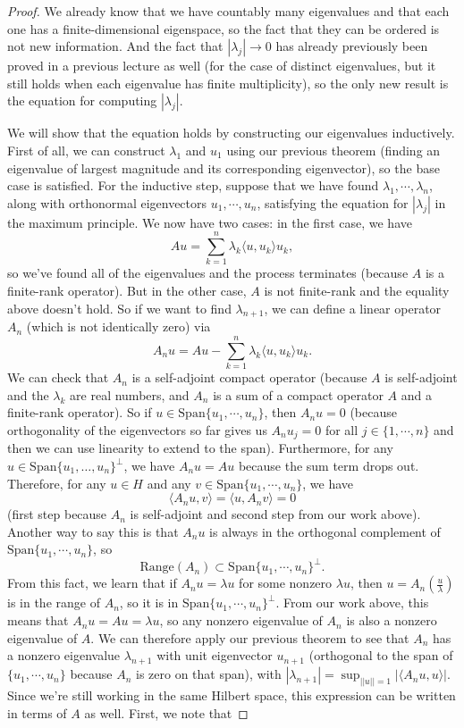 \begin{proof}
We already know that we have countably many eigenvalues and that each one has a finite-dimensional eigenspace, so the fact that they can be ordered is not new information. And the fact that $|\lambda_j| \to 0$ has already previously been proved in a previous lecture as well (for the case of distinct eigenvalues, but it still holds when each eigenvalue has finite multiplicity), so the only new result is the equation for computing $|\lambda_j|$. 

We will show that the equation holds by constructing our eigenvalues inductively. First of all, we can construct $\lambda_1$ and $u_1$ using our previous theorem (finding an eigenvalue of largest magnitude and its corresponding eigenvector), so the base case is satisfied. For the inductive step, suppose that we have found $\lambda_1, \cdots, \lambda_n$, along with orthonormal eigenvectors $u_1, \cdots, u_n$, satisfying the equation for $|\lambda_j|$ in the maximum principle. We now have two cases: in the first case, we have 
\[
    Au = \sum_{k=1}^n \lambda_k \langle u, u_k \rangle u_k,
\]
so we've found all of the eigenvalues and the process terminates (because $A$ is a finite-rank operator). But in the other case, $A$ is not finite-rank and the equality above doesn't hold. So if we want to find $\lambda_{n+1}$, we can define a linear operator $A_n$ (which is not identically zero) via
\[
    A_n u = Au  - \sum_{k=1}^n \lambda_k \langle u, u_k \rangle u_k.
\]
We can check that $A_n$ is a self-adjoint compact operator (because $A$ is self-adjoint and the $\lambda_k$ are real numbers, and $A_n$ is a sum of a compact operator $A$ and a finite-rank operator). So if $u \in \text{Span}\{u_1, \cdots, u_n\}$, then $A_n u = 0$ (because orthogonality of the eigenvectors so far gives us $A_n u_j = 0$ for all $j \in \{1, \cdots, n\}$ and then we can use linearity to extend to the span). Furthermore, for any $u \in \text{Span}\{u_1, \dots, u_n\}^\perp$, we have $A_n u = Au$ because the sum term drops out. Therefore, for any $u \in H$ and any $v \in \text{Span}\{u_1, \cdots, u_n\}$, we have
\[
    \langle A_nu, v \rangle = \langle u, A_n v \rangle = 0
\]
(first step because $A_n$ is self-adjoint and second step from our work above). Another way to say this is that $A_nu$ is always in the orthogonal complement of $\text{Span}\{u_1, \cdots, u_n\}$, so 
\[
    \text{Range}(A_n) \subset \text{Span}\{u_1, \cdots, u_n\}^\perp.
\]
From this fact, we learn that if $A_n u = \lambda u$ for some nonzero $\lambda u$, then $u = A_n\left(\frac{u}{\lambda}\right)$ is in the range of $A_n$, so it is in $\text{Span}\{u_1, \cdots, u_n\}^\perp$. From our work above, this means that $A_n u = A u = \lambda u$, so any nonzero eigenvalue of $A_n$ is also a nonzero eigenvalue of $A$. We can therefore apply our previous theorem to see that $A_n$ has a nonzero eigenvalue $\lambda_{n+1}$ with unit eigenvector $u_{n+1}$ (orthogonal to the span of $\{u_1, \cdots, u_n\}$ because $A_n$ is zero on that span), with $|\lambda_{n+1}| = \sup_{||u|| = 1} |\langle A_nu, u \rangle|$. Since we're still working in the same Hilbert space, this expression can be written in terms of $A$ as well. First, we note that

\end{proof}
